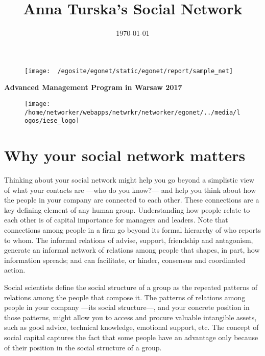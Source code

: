 \documentclass[a4paper,12pt]{article}
\title{\Huge{Anna Turska's Social Network}}
\date{\today}
\begin{document}
\clearpage
\thispagestyle{empty}

\maketitle


\begin{figure}[H]
\centering
\texttt{[image: ~/egosite/egonet/static/egonet/report/sample\_net]}
\end{figure}


\begin{center}
\Large{\textbf{Advanced Management Program in Warsaw 2017}}


\begin{figure}[H]
\centering
\texttt{[image: /home/networker/webapps/netwrkr/networker/egonet/../media/logos/iese\_logo]}
\end{figure}

\small{}
\end{center}

\newpage
\clearpage
{}


\section*{Why your social network matters}


Thinking about your social network might help you go beyond a simplistic view of what your contacts are ---who do you know?--- and help you think about how the people in your company are connected to each other. These connections are a key defining element of any human group. Understanding how people relate to each other is of capital importance for managers and leaders. Note that connections among people in a firm go beyond its formal hierarchy of who reports to whom. The informal relations of advise, support, friendship and antagonism, generate an informal network of relations among people that shapes, in part, how information spreads; and can facilitate, or hinder, consensus and coordinated action.

Social scientists define the social structure of a group as the repeated patterns of relations among the people that compose it. The patterns of relations among people in your company ---its social structure---, and your concrete position in those patterns, might allow you to access and procure valuable intangible assets, such as good advice, technical knowledge, emotional support, etc. The concept of social capital captures the fact that some people have an advantage only because of their position in the social structure of a group.
\end{document}
